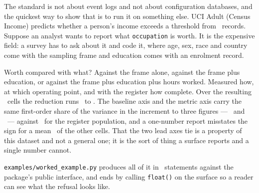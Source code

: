 
The standard is not about event logs and not about configuration databases,
and the quickest way to show that is to run it on something else. UCI Adult
(Census Income) predicts whether a person's income exceeds a threshold from
\exRows\ records. Suppose an analyst wants to report what \texttt{occupation}
is worth. It is the expensive field: a survey has to ask about it and code it,
where age, sex, race and country come with the sampling frame and education
comes with an enrolment record.

Worth compared with what? Against the frame alone, against the frame plus
education, or against the frame plus education plus hours worked. Measured
how, at which operating point, and with the register how complete. Over the
resulting \exCells\ cells the reduction runs \exRmin\ to \exRmax. The baseline
axis and the metric axis carry the same first-order share of the variance in
the increment to three figures --- \exSbaselinePct\ and \exSmetricPct\ ---
against \exSpopulationPct\ for the register population, and a one-number
report misstates the sign for a mean \exMisreportPct\ of the other cells. That
the two lead axes tie is a property of this dataset and not a general one; it
is the sort of thing a surface reports and a single number cannot.

\texttt{examples/worked\_example.py} produces all of it in \exampleLines\
statements against the package's public interface, and ends by calling
\texttt{float()} on the surface so a reader can see what the refusal looks
like.

